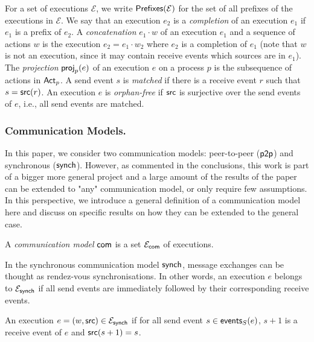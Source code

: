 For a set of executions $\mathcal{E}$, we write $\prefixclosureof{\mathcal{E}}$ 
for the set of all prefixes of the executions in $\mathcal{E}$. 
We say that an execution $e_2$ is a \emph{completion} of an execution $e_1$
if $e_1$ is a prefix of $e_2$. 
A \emph{concatenation} $e_1\cdot w$ of an execution
$e_1$ and a sequence of actions $w$ is the execution $e_2 = e_1\cdot w_2$ where 
$e_2$ is a completion of $e_1$ (note that $w$ is not an execution, since it may contain receive events
which sources are in $e_1$).  
The \emph{projection} $\projofon{e}{p}$ of an execution $e$ on a process $p$ 
is the subsequence of actions in $\Actp$.  
A send event $s$ is \emph{matched} if there is a receive event $r$ such that $s=\source(r)$.
An execution $e$ is \emph{orphan-free} if $\source$ is surjective over the send events of $e$, i.e.,
all send events are matched.

\subsubsection*{Communication Models.}
In this paper, we consider   two communication models: 
peer-to-peer ($\ppmodel$) and  synchronous ($\synchmodel$). 
However, as commented  in the conclusions,  this work is part of a bigger more general project and a large amount of the results of the paper can be extended to "any" communication model, or 
only require  few assumptions.  In this perspective, we  introduce a general definition of a communication model here
and discuss on specific results on how they can be extended to the general case.
\begin{definition}
	\label{def:communication-model}
	A \emph{communication model} $\acommunicationmodel$ is a set 
	$\executionsofmodel{\acommunicationmodel}$ of executions.
\end{definition}

In the  synchronous communication model $\synchmodel$, message exchanges can be thought as rendez-vous synchronisations.
In other words, an execution $e$ belongs to $\executionsofmodel{\synchmodel}$ if
all send events are immediately followed by their corresponding receive events.
\begin{definition}
	An execution $\execution=(w,\source) \in \executionsofmodel{\synchmodel}$ if
	for all send event $s\in\sendeventsof{e}$, $s+1$ is a receive event of $e$ and $\source(s+1)=s$.
\end{definition}

